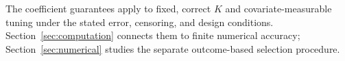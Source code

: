 The coefficient guarantees apply to fixed, correct $K$ and covariate-measurable tuning under the stated error, censoring, and design conditions. Section~\ref{sec:computation} connects them to finite numerical accuracy; Section~\ref{sec:numerical} studies the separate outcome-based selection procedure.
